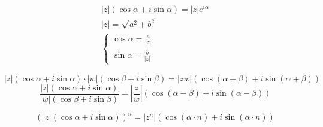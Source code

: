 \documentclass[a4paper,12pt]{article}
\begin{document}
\begin{gather*}
	\left| z \right| \left(\cos \alpha + i \sin \alpha \right) = \left|z\right| e^{i\alpha} \\
	\left| z \right| = \sqrt{a^2 + b^2}\\
	\left\{\begin{matrix}
		\cos \alpha = \frac{a}{\left| z \right|} \\
		\sin \alpha = \frac{b}{\left| z \right|}
	\end{matrix}\right.
\end{gather*}

\[\left| z \right| \left(\cos \alpha + i \sin \alpha \right) \cdot \left| w \right| \left(\cos \beta + i \sin \beta \right) = \left| z w \right| \left(\cos \left(\alpha + \beta\right) + i \sin \left(\alpha + \beta\right)\right)\]
\[\frac{\left| z \right| \left(\cos \alpha + i \sin \alpha\right)}
{\left| w \right| \left(\cos \beta + i \sin \beta \right)} = \left|\frac{z}{w}\right| \left(\cos \left(\alpha - \beta\right) + i \sin \left(\alpha - \beta\right)\right)\]

\[\left(\left| z \right| \left(\cos \alpha + i \sin \alpha \right) \right)^n = \left| z^n \right| \left(\cos \left(\alpha \cdot n\right) + i \sin \left(\alpha \cdot n\right)\right)\]
\end{document}
